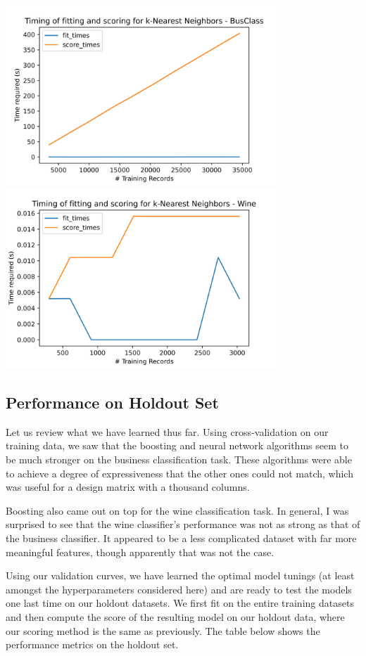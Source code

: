 \documentclass[
	letterpaper, %
]{jdf}
\begin{document}
\includegraphics[width=4in]{Figures/BusClass-0920/KNN/time_curve.png}
\includegraphics[width=4in]{Figures/Wine-0921/KNN/time_curve.png}

\subsection{Performance on Holdout Set}
Let us review what we have learned thus far. Using cross-validation on our training data, we saw that the boosting and neural network algorithms seem to be much stronger on the business classification task. These algorithms were able to achieve a degree of expressiveness that the other ones could not match, which was useful for a design matrix with a thousand columns.

Boosting also came out on top for the wine classification task. In general, I was surprised to see that the wine classifier's performance was not as strong as that of the business classifier. It appeared to be a less complicated dataset with far more meaningful features, though apparently that was not the case.

Using our validation curves, we have learned the optimal model tunings (at least amongst the hyperparameters considered here) and are ready to test the models one last time on our holdout datasets. We first fit on the entire training datasets and then compute the score of the resulting model on our holdout data, where our scoring method is the same as previously. The table below shows the performance metrics on the holdout set.
\end{document}
